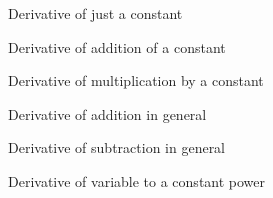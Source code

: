 
\begin{multicols}{2}

 \begin{FormulaBox}{Derivative of just a constant}
 \end{FormulaBox}

 \begin{FormulaBox}{Derivative of addition of a constant}
  \Formula{\D{\Y + \K}}{\D{\Y}}
 \end{FormulaBox}

 \begin{FormulaBox}{Derivative of multiplication by a constant}
  \Formula{\D{\K \cdot \Y}}{\K \cdot \D{\Y}}
 \end{FormulaBox}

 \columnbreak

 \begin{FormulaBox}{Derivative of addition in general}
  \Formula{\D{\U+\V}}{\D{\U} + \D{\V}}
 \end{FormulaBox}

 \begin{FormulaBox}{Derivative of subtraction in general}
  \Formula{\D{\U-\V}}{\D{\U} - \D{\V}}
 \end{FormulaBox}

 \begin{FormulaBox}{Derivative of variable to a constant power}
 \end{FormulaBox}

\end{multicols}

